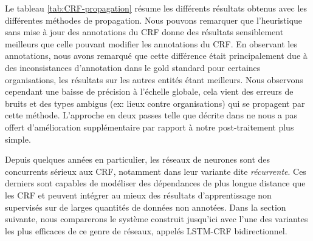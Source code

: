 \documentclass[citation\_needed]{subfiles}
\begin{document}
Le tableau \ref{tab:CRF-propagation} résume les différents résultats obtenus avec les différentes méthodes de propagation. Nous pouvons remarquer que l'heuristique sans mise à jour des annotations du CRF donne des résultats sensiblement meilleurs que celle pouvant modifier les annotations du CRF. En observant les annotations, nous avons remarqué que cette différence était principalement due à des inconsistances d'annotation dans le gold standard pour certaines organisations, les résultats sur les autres entités étant meilleurs. Nous observons cependant une baisse de précision à l'échelle globale, cela vient des erreurs de bruits et des types ambigus (ex: lieux contre organisations) qui se propagent par cette méthode. L'approche en deux passes telle que décrite dans \citet{krishnan2006effective,mao2007using,ratinov2009design} ne nous a pas offert d'amélioration supplémentaire par rapport à notre post-traitement plus simple.

Depuis quelques années en particulier, les réseaux de neurones sont des concurrents sérieux aux CRF, notamment dans leur variante dite \emph{récurrente}. Ces derniers sont capables de modéliser des dépendances de plus longue distance que les CRF et peuvent intégrer au mieux des résultats d'apprentissage non supervisés sur de larges quantités de données non annotées. Dans la section suivante, nous comparerons le système construit jusqu'ici avec l'une des variantes les plus efficaces de ce genre de réseaux, appelés LSTM-CRF bidirectionnel.
\end{document}
